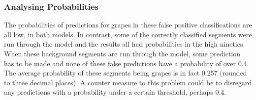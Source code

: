 \tocless\subsubsection{Analysing Probabilities}
The probabilities of predictions for grapes in these false positive classifications are all low, in both models.
In contrast, some of the correctly classified segments were run through the model and the results all had probabilities in the high nineties.
When these background segments are run through the model, some prediction has to be made and none of these false predictions have a probability of over 0.4.
The average probability of these segments being grapes is in fact 0.257 (rounded to three decimal places).
A counter measure to this problem could be to disregard any predictions with a probability under a certain threshold, perhaps 0.4.

